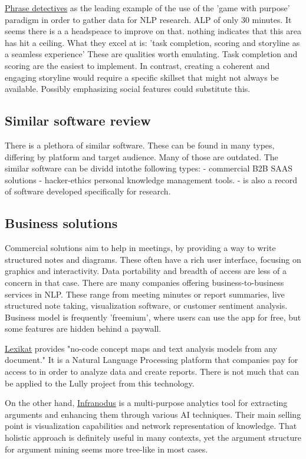 \documentclass{article}
\begin{document}
\href{https://dl.acm.org/doi/10.1145/2448116.2448119}{Phrase detectives} as the leading example of the use of the 'game with purpose' paradigm in order to gather data for NLP research.
ALP of only 30 minutes. It seems there is a a headspeace to improve on that. nothing indicates that this area has hit a ceiling.
What they excel at is: 'task completion, scoring and storyline as a seamless experience'
These are qualities worth emulating. Task completion and scoring are the easiest to implement. 
In contrast, creating a coherent and engaging storyline would require a specific skillset that might not always be available.
Possibly emphasizing social features could substitute this.

\subsection{Similar software review}
There is a plethora of similar software. These can be found in many types, differing by platform and target audience. Many of those are outdated.
The similar software can be dividd intothe following types:
- commercial B2B SAAS solutions
- hacker-ethics personal knowledge management tools.
- is also a record of software developed specifically for research.

\subsection{Business solutions}
Commercial solutions aim to help in meetings, by providing a way to write structured notes and diagrams. These often have a rich user interface, focusing on graphics and interactivity.
Data portability and breadth of access are less of a concern in that case.
There are many companies offering business-to-business services in NLP.  These range from meeting minutes or report summaries, live structured note taking, visualization software, or customer sentiment analysis.  Business model is frequently 'freemium', where users can use the app for free, but some features are hidden behind a paywall.

\href{https://lexikat.com/#/}{Lexikat} provides "no-code concept maps and text analysis models from any document." It is a Natural Language Processing platform that companies pay for access to in order to analyze data and create reports. There is not much that can be applied to the Lully project from this technology.

On the other hand, \href{https://infranodus.com/}{Infranodus} is a multi-purpose analytics tool for extracting arguments and enhancing them through various AI techniques. Their main selling point is visualization capabilities and network representation of knowledge. That holistic approach is definitely useful in many contexts, yet the argument structure for argument mining seems more tree-like in most cases.
\end{document}
